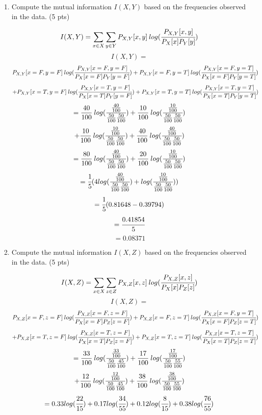 \documentclass[a4paper]{article}
\theoremstyle{definition}
\newenvironment{soln}{
    \leavevmode\color{blue}\ignorespaces
}{}
\begin{document}
\begin{enumerate}
	\item Compute the mutual information $I(X, Y)$ based on the frequencies observed in the data. (5 pts)
	\begin{soln}
        \[  I(X, Y) = \sum_{x \in X} \sum_{y \in Y} P_{X,Y}[x, y]\:log(\cfrac{P_{X,Y}[x, y]}{P_X[x]P_Y[y]})  \]
        \[  I(X, Y) = \]
        \[ P_{X,Y}[x=F, y=F]\:log(\cfrac{P_{X,Y}[x=F, y=F]}{P_X[x=F]P_Y[y=F]}) + P_{X,Y}[x=F, y=T]\:log(\cfrac{P_{X,Y}[x=F, y=T]}{P_X[x=F]P_Y[y=T]})\]
        \[  + P_{X,Y}[x=T, y=F]\:log(\cfrac{P_{X,Y}[x=T, y=F]}{P_X[x=T]P_Y[y=F]}) + P_{X,Y}[x=T, y=T]\:log(\cfrac{P_{X,Y}[x=T, y=T]}{P_X[x=T]P_Y[y=T]})\]
        \[  = \frac{40}{100}\:log(\cfrac{\frac{40}{100}}{\frac{50}{100}\frac{50}{100}}) + \frac{10}{100}\:log(\cfrac{\frac{10}{100}}{\frac{50}{100}\frac{50}{100}})\]
        \[  + \frac{10}{100}\:log(\cfrac{\frac{10}{100}}{\frac{50}{100}\frac{50}{100}}) + \frac{40}{100}\:log(\cfrac{\frac{40}{100}}{\frac{50}{100}\frac{50}{100}})\]
        \[  = \frac{80}{100}\:log(\cfrac{\frac{40}{100}}{\frac{50}{100}\frac{50}{100}}) + \frac{20}{100}\:log(\cfrac{\frac{10}{100}}{\frac{50}{100}\frac{50}{100}})\]
        \[  = \cfrac{1}{5} (4log(\cfrac{\frac{40}{100}}{\frac{50}{100}\frac{50}{100}}) + log(\cfrac{\frac{10}{100}}{\frac{50}{100}\frac{50}{100}})) \]
        \[  = \cfrac{1}{5} (0.81648 - 0.39794) \]
        \[  = \cfrac{0.41854}{5} \]
        \[  = 0.08371\]
    \end{soln}
	\item Compute the mutual information $I(X, Z)$ based on the frequencies observed in the data. (5 pts)
	\begin{soln}
        \[  I(X, Z) = \sum_{x \in X} \sum_{z \in Z} P_{X,Z}[x, z]\:log(\cfrac{P_{X,Z}[x, z]}{P_X[x]P_Z[z]})  \]
        \[  I(X, Z) = \]
        \[ P_{X,Z}[x=F, z=F]\:log(\cfrac{P_{X,Z}[x=F, z=F]}{P_X[x=F]P_Z[z=F]}) + P_{X,Z}[x=F, z=T]\:log(\cfrac{P_{X,Z}[x=F, y=T]}{P_X[x=F]P_Z[z=T]})\]
        \[  + P_{X,Z}[x=T, z=F]\:log(\cfrac{P_{X,Z}[x=T, z=F]}{P_X[x=T]P_Z[z=F]}) + P_{X,Z}[x=T, z=T]\:log(\cfrac{P_{X,Z}[x=T, z=T]}{P_X[x=T]P_Z[z=T]})\]
        \[  = \frac{33}{100}\:log(\cfrac{\frac{33}{100}}{\frac{50}{100}\frac{45}{100}}) + \frac{17}{100}\:log(\cfrac{\frac{17}{100}}{\frac{50}{100}\frac{55}{100}})\]
        \[  + \frac{12}{100}\:log(\cfrac{\frac{12}{100}}{\frac{50}{100}\frac{45}{100}}) + \frac{38}{100}\:log(\cfrac{\frac{38}{100}}{\frac{50}{100}\frac{55}{100}})\]
        \[  = 0.33log(\cfrac{22}{15}) + 0.17log(\cfrac{34}{55}) + 0.12log(\cfrac{8}{15}) + 0.38log(\cfrac{76}{55}) \]

\end{soln}
\end{enumerate}
\end{document}
